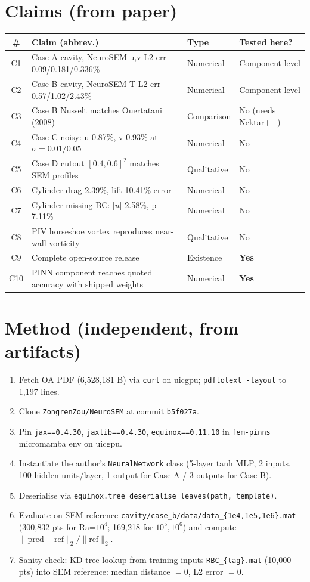 \documentclass[11pt]{article}
\begin{document}
\section{Claims (from paper)}
\begin{tabular}{@{}clll@{}}
\toprule
\# & Claim (abbrev.) & Type & Tested here? \\
\midrule
C1 & Case A cavity, NeuroSEM u,v L2 err 0.09/0.181/0.336\% & Numerical & Component-level \\
C2 & Case B cavity, NeuroSEM T L2 err 0.57/1.02/2.43\%    & Numerical & Component-level \\
C3 & Case B Nusselt matches Ouertatani (2008)             & Comparison & No (needs Nektar++) \\
C4 & Case C noisy: u 0.87\%, v 0.93\% at $\sigma=0.01/0.05$ & Numerical & No \\
C5 & Case D cutout $[0.4,0.6]^2$ matches SEM profiles     & Qualitative & No \\
C6 & Cylinder drag 2.39\%, lift 10.41\% error             & Numerical & No \\
C7 & Cylinder missing BC: $|u|$ 2.58\%, p 7.11\%          & Numerical & No \\
C8 & PIV horseshoe vortex reproduces near-wall vorticity  & Qualitative & No \\
C9 & Complete open-source release                         & Existence & \textbf{Yes} \\
C10 & PINN component reaches quoted accuracy with shipped weights & Numerical & \textbf{Yes} \\
\bottomrule
\end{tabular}

\section{Method (independent, from artifacts)}
\begin{enumerate}
  \item Fetch OA PDF (6{,}528{,}181 B) via \texttt{curl} on uicgpu; \texttt{pdftotext -layout} to 1{,}197 lines.
  \item Clone \texttt{ZongrenZou/NeuroSEM} at commit \texttt{b5f027a}.
  \item Pin \texttt{jax==0.4.30}, \texttt{jaxlib==0.4.30}, \texttt{equinox==0.11.10} in \texttt{fem-pinns} micromamba env on uicgpu.
  \item Instantiate the author's \texttt{NeuralNetwork} class (5-layer tanh MLP, 2 inputs, 100 hidden units/layer, 1 output for Case A / 3 outputs for Case B).
  \item Deserialise via \texttt{equinox.tree\_deserialise\_leaves(path, template)}.
  \item Evaluate on SEM reference \texttt{cavity/case\_b/data/data\_\{1e4,1e5,1e6\}.mat} (300{,}832 pts for Ra=$10^4$; 169{,}218 for $10^5,10^6$) and compute $\|\text{pred}-\text{ref}\|_2 / \|\text{ref}\|_2$.
  \item Sanity check: KD-tree lookup from training inputs \texttt{RBC\_\{tag\}.mat} (10{,}000 pts) into SEM reference: median distance $=0$, L2 error $=0$.
\end{enumerate}
\end{document}
